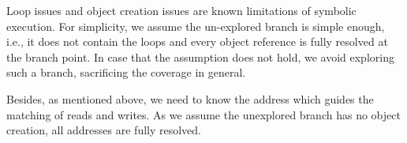 Loop issues and object creation issues are known limitations of symbolic execution. For simplicity, we assume the un-explored branch is simple enough, i.e., it does not contain the loops and every object reference is fully resolved at the branch point. In case that the assumption does not hold, we avoid exploring such a branch, sacrificing the coverage in general. 

Besides, as mentioned above, we need to know the address which guides the matching of reads and writes. As we assume the unexplored branch has no object creation, all addresses are fully resolved.





